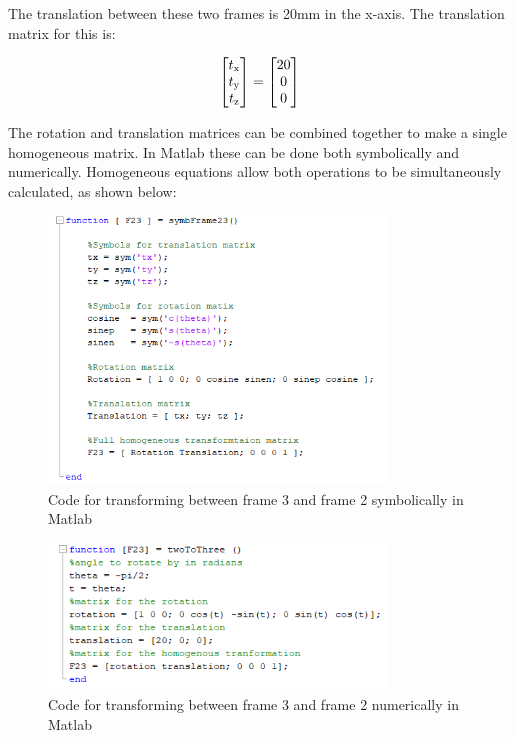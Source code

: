 \documentclass [11pt]{report}
\begin{document}
The translation between these two frames is 20mm in the x-axis. The translation matrix for this is:

\begin{equation*}
\begin{bmatrix}
t\textsubscript{x}\\
t\textsubscript{y}\\
t\textsubscript{z}\\
\end{bmatrix}
=
\begin{bmatrix}
20\\
0\\
0\\
\end{bmatrix}
\end{equation*}

The rotation and translation matrices can be combined together to make a single homogeneous matrix. In Matlab these can be done both symbolically and numerically. Homogeneous equations allow both operations to be simultaneously calculated, as shown below:

\begin{figure}[H]
\centerline{\includegraphics[width=9cm]{symbFrame23.png}}
\caption{Code for transforming between frame 3 and frame 2 symbolically in Matlab}
\label{fig}
\end{figure}

\begin{figure}[H]
\centerline{\includegraphics[width=9cm]{twoToThreecode.png}}
\caption{Code for transforming between frame 3 and frame 2 numerically in Matlab}
\label{fig}
\end{figure}
\end{document}
